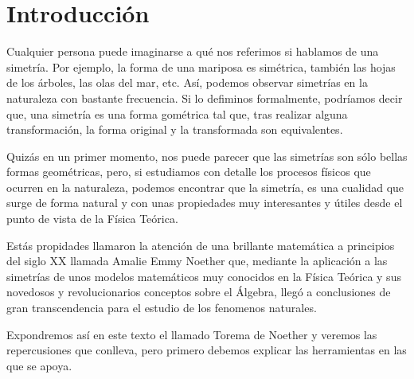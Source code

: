 \section{Introducción}\label{sec:introduccion}

Cualquier persona puede imaginarse a qué nos referimos si hablamos de una simetría. Por ejemplo, la forma de una mariposa es simétrica, también las hojas de los árboles, las olas del mar, etc. Así, podemos observar simetrías en la naturaleza con bastante frecuencia.
Si lo defiminos formalmente, podríamos decir que, una simetría es una forma gométrica tal que, tras realizar alguna transformación, la forma original y la transformada son equivalentes.

Quizás en un primer momento, nos puede parecer que las simetrías son sólo bellas formas geométricas, pero, si estudiamos con detalle los procesos físicos que ocurren en la naturaleza, podemos encontrar que la simetría, es una cualidad que surge de forma natural y con unas propiedades muy interesantes y útiles desde el punto de vista de la Física Teórica.

Estás propidades llamaron la atención de una brillante matemática a principios del siglo XX llamada Amalie Emmy Noether que, mediante la aplicación a las simetrías de unos modelos matemáticos muy conocidos en la Física Teórica y sus novedosos y revolucionarios conceptos sobre el Álgebra, llegó a conclusiones de gran transcendencia para el estudio de los fenomenos naturales.

Expondremos así en este texto el llamado Torema de Noether y veremos las repercusiones que conlleva, pero primero debemos explicar las herramientas en las que se apoya. 




